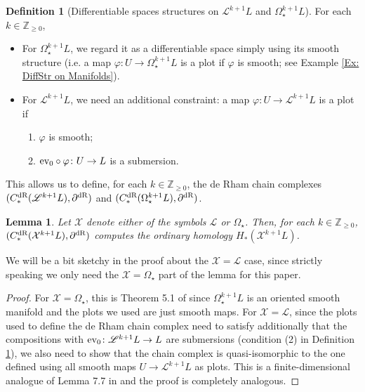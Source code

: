 \documentclass[10pt]{amsart}
\numberwithin{equation}{section}
\theoremstyle{plain}
\newtheorem{lemma}[theorem]{Lemma}
\theoremstyle{definition}
\newtheorem{definition}[theorem]{Definition}
\theoremstyle{remark}
\numberwithin{equation}{section}
\newcommand{\Z}{\mathbb{Z}}
\newcommand{\ev}{\textup{ev}}
\newcommand{\mc}[1]{\mathcal{#1}}
\newcommand{\ms}[1]{\mathscr{#1}}
\newcommand{\dR}{\textup{dR}}
\begin{document}
{\begin{definition}[Differentiable spaces structures on $\mathscr{L}^{k+1}L$ and $\Omega^{k+1}_\star L$]\label{Defn: DiffSpaceOnLoops}For each $k\in \Z_{\geq 0}$,
\begin{itemize}
	\item For $\Omega^{k+1}_\star L$, we regard it as a differentiable space simply using its smooth structure (i.e. a map $\varphi\colon U\to \Omega^{k+1}_\star L$ is a plot if $\varphi$ is smooth; see Example \ref{Ex: DiffStr on Manifolds}).
	\item  For $\mathscr{L}^{k+1} L$, we need an additional constraint: a map $\varphi\colon U\to \mathscr{L}^{k+1}L$ is a plot if 
\begin{enumerate}
	\item $\varphi$ is smooth;
	\item $\ev_0\circ \varphi\colon U\to L$ is a submersion.
\end{enumerate}
\end{itemize}
\end{definition}
This allows us to define, for each $k\in \Z_{\geq 0}$, the de Rham chain complexes $(C_*^\dR(\mathscr{L}^{k+1} L), \partial^\dR)$ and $(C_*^\dR(\Omega_\star^{k+1} L), \partial^\dR)$.

\begin{lemma}\label{Lm: dRchainComputesHomology}
	Let $\mathcal{X}$ denote either of the symbols $\mathscr{L}$ or $\Omega_\star$.
	Then, for each $k\in\Z_{\geq 0}$,
	$(C_*^\dR(\mathcal{X}^{k+1} L), \partial^\dR)$ computes the ordinary homology $H_*(\mathcal{X}^{k+1} L)$.
\end{lemma}
We will be a bit sketchy in the proof about the $\mc{X}=\ms{L}$ case, since strictly speaking we only need the $\mc{X}=\Omega_\star$ part of the lemma for this paper.
\begin{proof}
	For $\mc{X}=\Omega_\star$, this is Theorem 5.1 of \cite{Irie1} since $\Omega^{k+1}_\star L$ is an oriented smooth manifold and the plots we used are just smooth maps.
	For $\mc{X}=\ms{L}$, since the plots used to define the de Rham chain complex need to satisfy additionally that the compositions with $\ev_0\colon \ms{L}^{k+1} L\to L$ are submersions (condition (2) in Definition \ref{Defn: DiffSpaceOnLoops}), we also need to show that the chain complex is quasi-isomorphic to the one defined using all smooth maps $U\to \ms{L}^{k+1}L$ as plots. This is a finite-dimensional analogue of Lemma 7.7 in \cite{Irie1} and the proof is completely analogous.
\end{proof}


}
\end{document}
